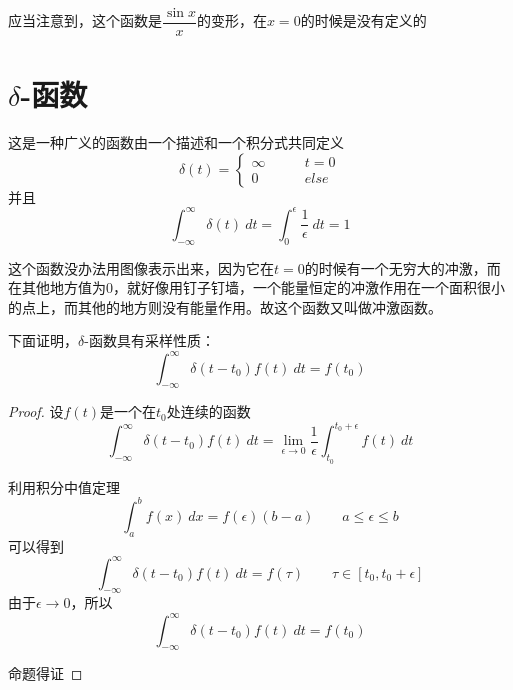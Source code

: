         应当注意到，这个函数是$\dfrac{\sin x}{x}$的变形，在$x=0$的时候是没有定义的

    \section{$\delta$-函数}

        这是一种广义的函数由一个描述和一个积分式共同定义
        \begin{equation}
            \delta(t) = \left\{
            \begin{aligned}
            \infty & \qquad t=0\\
            0& \qquad else 
            \end{aligned}
            \right.
            \label{eq: 2.4}
        \end{equation}
        并且
        \begin{equation}
            \int_{-\infty}^{\infty}\delta(t)\ dt=\int_{0}^{\epsilon}\dfrac{1}{\epsilon}\ dt=1
            \label{eq: 2.5}
        \end{equation}

        这个函数没办法用图像表示出来，因为它在$t = 0$的时候有一个无穷大的冲激，而在其他地方值为0，就好像用钉子钉墙，一个能量恒定的冲激作用在一个面积很小的点上，而其他的地方则没有能量作用。故这个函数又叫做冲激函数。

        下面证明，$\delta$-函数具有采样性质：
        \begin{equation}
            \int_{-\infty}^{\infty}\delta(t-t_0)f(t)\ dt=f(t_0)
            \label{eq: 2.6}
        \end{equation}

        \begin{proof}
            设$f(t)$是一个在$t_0$处连续的函数
            \begin{equation}
                \int_{-\infty}^{\infty}\delta(t-t_0)f(t)\ dt = \lim_{\epsilon\to 0}\dfrac{1}{\epsilon}\int_{t_0}^{t_0+\epsilon}f(t)\ dt
                \label{eq: 2.7}
            \end{equation}
            
            利用积分中值定理
            \begin{equation}
                \int_{a}^{b}f(x)\ dx = f(\epsilon) (b - a)\qquad a\leq\epsilon\leq b
                \label{eq: 2.8}
            \end{equation}
            可以得到
            \begin{equation}
                \int_{-\infty}^{\infty}\delta(t-t_0)f(t)\ dt = f(\tau)\qquad \tau\in\left[t_0, t_0 + \epsilon\right]
                \label{eq: 2.9}
            \end{equation}
            由于$\epsilon\to 0$，所以
            \begin{equation}
                \int_{-\infty}^{\infty}\delta(t-t_0)f(t)\ dt = f(t_0)
                \label{eq: 2.10}
            \end{equation}
            
            命题得证
        \end{proof}

